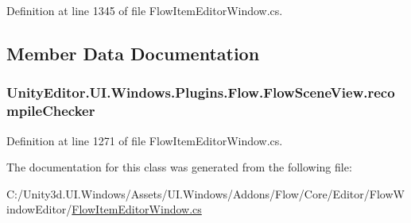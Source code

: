 Definition at line 1345 of file Flow\+Item\+Editor\+Window.\+cs.



\subsection{Member Data Documentation}
\hypertarget{class_unity_editor_1_1_u_i_1_1_windows_1_1_plugins_1_1_flow_1_1_flow_scene_view_a88c473cfa23c613491289fb85b6e2108}{}
\subsubsection[{recompile\+Checker}]{ Unity\+Editor.\+U\+I.\+Windows.\+Plugins.\+Flow.\+Flow\+Scene\+View.\+recompile\+Checker\hspace{0.3cm}{\ttfamily [static]}}\label{class_unity_editor_1_1_u_i_1_1_windows_1_1_plugins_1_1_flow_1_1_flow_scene_view_a88c473cfa23c613491289fb85b6e2108}


Definition at line 1271 of file Flow\+Item\+Editor\+Window.\+cs.



The documentation for this class was generated from the following file\+:\begin{DoxyCompactItemize}
\item 
C\+:/\+Unity3d.\+U\+I.\+Windows/\+Assets/\+U\+I.\+Windows/\+Addons/\+Flow/\+Core/\+Editor/\+Flow\+Window\+Editor/\hyperlink{_flow_item_editor_window_8cs}{Flow\+Item\+Editor\+Window.\+cs}\end{DoxyCompactItemize}
